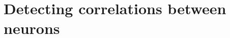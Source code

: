 \documentclass[twocolumn]{article}
\begin{document}
\begin{figure} 
\end{figure}

\section{\label{sec:correlations}Detecting correlations between neurons}
\end{document}
